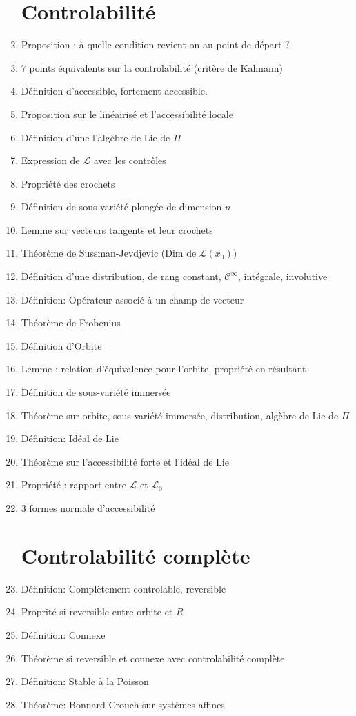 \documentclass{article}
\begin{document}
\begin{enumerate}
\section{Controlabilité}
	\item Proposition : à quelle condition revient-on au point de départ ?
	\item 7 points équivalents sur la controlabilité (critère de Kalmann)
	\item Définition d'accessible, fortement accessible.
	\item Proposition sur le linéairisé et l'accessibilité locale \item Définition d'une l'algèbre de Lie de $\Pi$
	\item Expression de $\mathcal{L}$ avec les contrôles
	\item Propriété des crochets
	\item Définition de sous-variété plongée de dimension $n$
	\item Lemme sur vecteurs tangents et leur crochets
	\item Théorème de Sussman-Jevdjevic (Dim de $\mathcal{L}(x_0)$)
	\item Définition d'une distribution, de rang constant, $\mathcal{C}^{\infty}$, intégrale, involutive
	\item Définition: Opérateur associé à un champ de vecteur
	\item Théorème de Frobenius
	\item Définition d'Orbite
	\item Lemme : relation d'équivalence pour l'orbite, propriété en résultant
	\item Définition de sous-variété immersée
	\item Théorème sur orbite, sous-variété immersée, distribution, algèbre de Lie de $\Pi$
	\item Définition: Idéal de Lie
	\item Théorème sur l'accessibilité forte et l'idéal de Lie
	\item Propriété : rapport entre $\mathcal{L}$ et $\mathcal{L}_0$
	\item 3 formes normale d'accessibilité
\section{Controlabilité complète}
	\item Définition: Complètement controlable, reversible
	\item Proprité si reversible entre orbite et $R$
	\item Définition: Connexe
	\item Théorème si reversible et connexe avec controlabilité complète
	\item Définition: Stable à la Poisson
	\item Théorème: Bonnard-Crouch sur systèmes affines

\end{enumerate}
\end{document}
